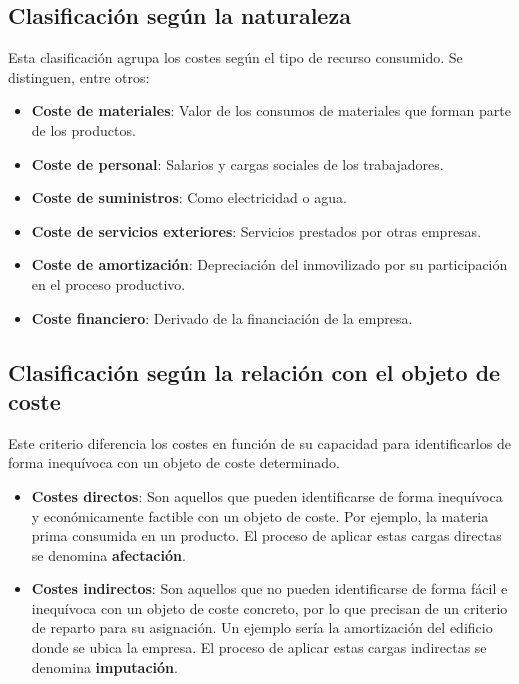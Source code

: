 \subsection{Clasificación según la naturaleza}
Esta clasificación agrupa los costes según el tipo de recurso consumido. Se distinguen, entre otros:
\begin{itemize}
    \item \textbf{Coste de materiales}: Valor de los consumos de materiales que forman parte de los productos.
    \item \textbf{Coste de personal}: Salarios y cargas sociales de los trabajadores.
    \item \textbf{Coste de suministros}: Como electricidad o agua.
    \item \textbf{Coste de servicios exteriores}: Servicios prestados por otras empresas.
    \item \textbf{Coste de amortización}: Depreciación del inmovilizado por su participación en el proceso productivo.
    \item \textbf{Coste financiero}: Derivado de la financiación de la empresa.
\end{itemize}

\subsection{Clasificación según la relación con el objeto de coste}
Este criterio diferencia los costes en función de su capacidad para identificarlos de forma inequívoca con un objeto de coste determinado.
\begin{itemize}
    \item \textbf{Costes directos}: Son aquellos que pueden identificarse de forma inequívoca y económicamente factible con un objeto de coste. Por ejemplo, la materia prima consumida en un producto. El proceso de aplicar estas cargas directas se denomina \textbf{afectación}.
    \item \textbf{Costes indirectos}: Son aquellos que no pueden identificarse de forma fácil e inequívoca con un objeto de coste concreto, por lo que precisan de un criterio de reparto para su asignación. Un ejemplo sería la amortización del edificio donde se ubica la empresa. El proceso de aplicar estas cargas indirectas se denomina \textbf{imputación}.
\end{itemize}

